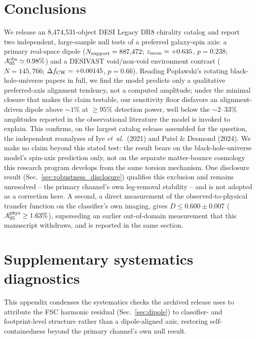 \documentclass[twocolumn,linenumbers]{aastex702}
\newcommand{\etal}{\textit{et~al.}}
\newcommand{\FSC}{\textsc{FSC}}
\begin{document}
\section{Conclusions}
\label{sec:conclusions}

We release an 8,474,531-object DESI Legacy DR8 chirality catalog and report
two independent, large-sample null tests of a preferred galaxy-spin axis:
a primary real-space dipole ($N_{\rm support}=887{,}472$;
$z_{\rm mom}=+0.635$, $p=0.238$; $A_{95}^{\rm obs}\simeq0.98\%$) and a
DESIVAST void/non-void environment contrast ($N=145{,}766$;
$\Delta f_{\rm CW}=+0.00145$, $p=0.66$). Reading Poplawski's rotating
black-hole-universe papers in full, we find the model predicts only a
qualitative preferred-axis alignment tendency, not a computed amplitude;
under the minimal closure that makes the claim testable, our sensitivity
floor disfavors an alignment-driven dipole above $\sim\!1\%$ at
$\geq\!95\%$ detection power, well below the $\sim\!2$--$33\%$ amplitudes
reported in the observational literature the model is invoked to explain.
This confirms, on the largest catalog release assembled for the question,
the independent reanalyses of Iye \etal\ (2021) and Patel \& Desmond
(2024). We make no claim beyond this stated test: the
result bears on the black-hole-universe model's spin-axis prediction only,
not on the separate matter-bounce cosmology this research program develops
from the same torsion mechanism. One disclosure result
(Sec.~\ref{sec:robustness_disclosure}) qualifies this exclusion and
remains unresolved -- the primary channel's own leg-removal stability --
and is not adopted as a correction here. A second, a direct measurement of
the observed-to-physical transfer function on the classifier's own imaging,
gives $D \le 0.600 \pm 0.007$ ($A_{95}^{\rm phys} \ge 1.63\%$), superseding
an earlier out-of-domain measurement that this manuscript withdraws, and is
reported in the same section.

\appendix

\section{Supplementary systematics diagnostics}
\label{sec:app_systematics}

This appendix condenses the systematics checks the archived release uses
to attribute the \FSC{} harmonic residual (Sec.~\ref{sec:dipole}) to
classifier- and footprint-level structure rather than a dipole-aligned
axis, restoring self-containedness beyond the primary channel's own
null result.
\end{document}
